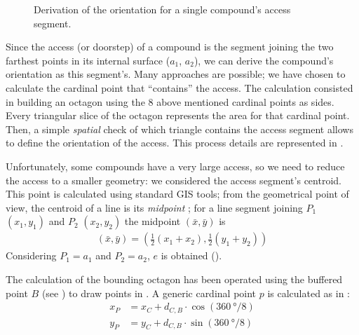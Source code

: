 \begin{wrapfigure}{r}{0.45\textwidth}
                    \caption[Graphical rapresentation of the steps to derive compound's access orientation]{Derivation of the orientation for a single compound's access segment.%
                    }
                    \label{fig:comp-orient}
                    \vspace{-0.1\textheight}
                \end{wrapfigure}
                Since the access (or doorstep) of a compound is the segment joining the two farthest points in its internal surface ($a_1$, $a_2$), we can derive the compound's orientation as this segment's. Many approaches are possible; we have chosen to calculate the cardinal point that ``contains'' the access. The calculation consisted in building an octagon using the 8 above mentioned cardinal points as sides. Every triangular slice of the octagon represents the area for that cardinal point. Then, a simple \emph{spatial} check of which triangle contains the access segment allows to define the orientation of the access. This process details are represented in .
                
                Unfortunately, some compounds have a very large access, so we need to reduce the access to a smaller geometry: we considered the access segment's centroid. This point is calculated using standard GIS tools; from the geometrical point of view, the centroid of a line is its \emph{midpoint} \cite{calculus-geom}; for a line segment joining $P_1$ $(x_1, y_1)$ and $P_2$ $(x_2, y_2)$ the midpoint $(\bar{x}, \bar{y})$ is
                \begin{align}
                    \label{eq:midpoint}
                    \left(\bar{x}, \bar{y}\right) = \left(\frac{1}{2}\left(x_1 + x_2\right),\frac{1}{2}\left(y_1 + y_2\right)\right)
                \end{align}
                Considering $P_1 = a_1$ and $P_2 = a_2$, $e$ is obtained ().
                
                The calculation of the bounding octagon has been operated using the buffered point $B$ (see ) to draw points in . A generic cardinal point $p$ is calculated as in :
                \begin{align}
                    \label{eq:point-cardinal}
                    x_P &= x_C + d_{C,B}\cdot\cos{(\SI{360}{\degree}/8)}\\
                    y_P &= y_C + d_{C,B}\cdot\sin{(\SI{360}{\degree}/8)}
                \end{align}
                

